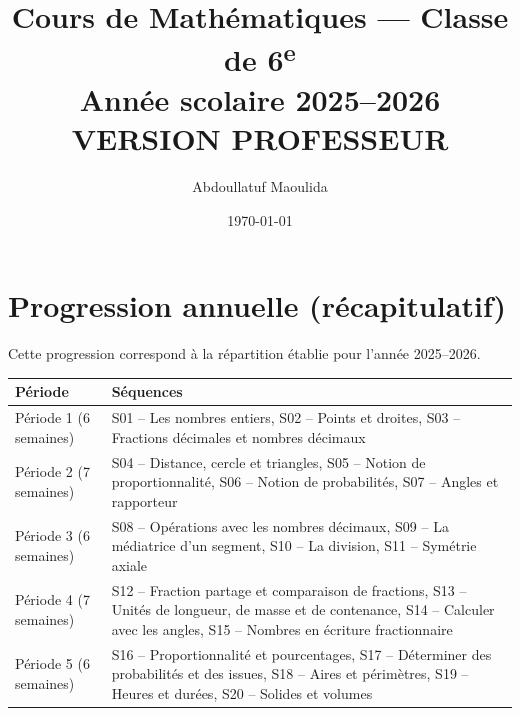 \documentclass[12pt,a4paper]{book}
\title{Cours de Mathématiques — Classe de 6\textsuperscript{e}\\[0.4em]\large Année scolaire 2025–2026\\[0.2em]\textcolor{mainBlue}{\normalsize VERSION PROFESSEUR}}
\author{Abdoullatuf Maoulida}
\date{\today}
\newcommand{\InputSeq}[2]{%
	\setcounter{chapter}{\numexpr#1-1\relax}%
}
\begin{document}
\VersionCorrige
\maketitle
\tableofcontents
\cleardoublepage

\InputSeq{6}{chapitres/seq_06_proportionnalite_partie_1}

\cleardoublepage
\appendix
\chapter{Progression annuelle (récapitulatif)}
Cette progression correspond à la répartition établie pour l'année 2025–2026.

\begin{center}
\renewcommand{\arraystretch}{1.2}
\begin{tabularx}{\textwidth}{|>{\raggedright\arraybackslash}p{}|>{\raggedright\arraybackslash}X|}
\hline
\textbf{Période} & \textbf{Séquences}\\ \hline
Période 1 (6 semaines) & S01 -- Les nombres entiers, S02 -- Points et droites, S03 -- Fractions décimales et nombres décimaux\\ \hline
Période 2 (7 semaines) & S04 -- Distance, cercle et triangles, S05 -- Notion de proportionnalité, S06 -- Notion de probabilités, S07 -- Angles et rapporteur\\ \hline
Période 3 (6 semaines) & S08 -- Opérations avec les nombres décimaux, S09 -- La médiatrice d'un segment, S10 -- La division, S11 -- Symétrie axiale\\ \hline
Période 4 (7 semaines) & S12 -- Fraction partage et comparaison de fractions, S13 -- Unités de longueur, de masse et de contenance, S14 -- Calculer avec les angles, S15 -- Nombres en écriture fractionnaire\\ \hline
Période 5 (6 semaines) & S16 -- Proportionnalité et pourcentages, S17 -- Déterminer des probabilités et des issues, S18 -- Aires et périmètres, S19 -- Heures et durées, S20 -- Solides et volumes\\ \hline
\end{tabularx}
\end{center}
\end{document}
